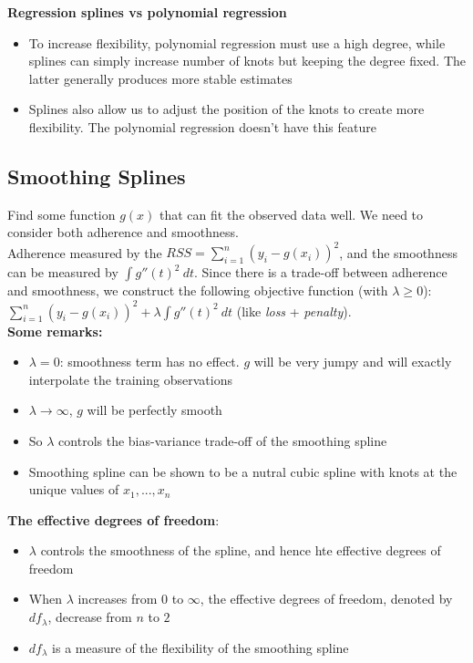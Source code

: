 \documentclass[11pt]{article}
\begin{document}
\noindent \textbf{Regression splines vs polynomial regression}
\begin{itemize}
    \item To increase flexibility, polynomial regression must use a high degree, while splines can simply increase number of knots but keeping the degree fixed. The latter generally produces more stable estimates
    \item Splines also allow us to adjust the position of the knots to create more flexibility. The polynomial regression doesn't have this feature
\end{itemize}

\subsection{Smoothing Splines}
\noindent Find some function $g(x)$ that can fit the observed data well. We need to consider both adherence and smoothness. \\

\noindent Adherence measured by the $RSS = \sum_{i=1}^{n}{(y_i - g(x_i))^2}$, and the smoothness can be measured by $\int g''(t)^2 \ dt$. Since there is a trade-off between adherence and smoothness, we construct the following objective function (with $\lambda \geq 0$): $\sum_{i=1}^{n}(y_i - g(x_i))^2 + \lambda \int g''(t)^2 \ dt$ (like \textit{loss} + \textit{penalty}). \\

\noindent \textbf{Some remarks:}
\begin{itemize}
    \item $\lambda = 0$: smoothness term has no effect. $g$ will be very jumpy and will exactly interpolate the training observations
    \item $\lambda \rightarrow \infty$, $g$ will be perfectly smooth
    \item So $\lambda$ controls the bias-variance trade-off of the smoothing spline
    \item Smoothing spline can be shown to be a nutral cubic spline with knots at the unique values of $x_1,...,x_n$
\end{itemize} \phantom{i}

\noindent \textbf{The effective degrees of freedom}:
\begin{itemize}
    \item $\lambda$ controls the smoothness of the spline, and hence hte effective degrees of freedom
    \item When $\lambda$ increases from $0$ to $\infty$, the effective degrees of freedom, denoted by $df_\lambda$, decrease from $n$ to $2$
    \item $df_\lambda$ is a measure of the flexibility of the smoothing spline
\end{itemize} \phantom{i}
\end{document}
